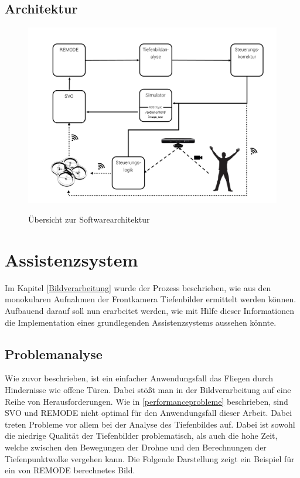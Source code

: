 \subsection{Architektur}

\begin{figure}[ht]
	\centering
	\includegraphics[scale=0.5]{Bilder/architecture.jpg}
	\label{fig:architecture}
	\caption{Übersicht zur Softwarearchitektur}
\end{figure}



\newpage
\section{Assistenzsystem}
Im Kapitel \ref{Bildverarbeitung} wurde der Prozess beschrieben, wie aus den monokularen Aufnahmen der Frontkamera Tiefenbilder ermittelt werden können. Aufbauend darauf soll nun erarbeitet werden, wie mit Hilfe dieser Informationen die Implementation eines grundlegenden Assistenzsystems aussehen könnte.

\subsection{Problemanalyse}
Wie zuvor beschrieben, ist ein einfacher Anwendungsfall das Fliegen durch Hindernisse wie offene Türen. Dabei stößt man in der Bildverarbeitung auf eine Reihe von Herausforderungen. Wie in \ref{performanceprobleme} beschrieben, sind SVO und REMODE nicht optimal für den Anwendungsfall dieser Arbeit. Dabei treten Probleme vor allem bei der Analyse des Tiefenbildes auf. Dabei ist sowohl die niedrige Qualität der Tiefenbilder problematisch, als auch die hohe Zeit, welche zwischen den Bewegungen der Drohne und den Berechnungen der Tiefenpunktwolke vergehen kann. \newline
Die Folgende Darstellung zeigt ein Beispiel für ein von REMODE berechnetes Bild.

